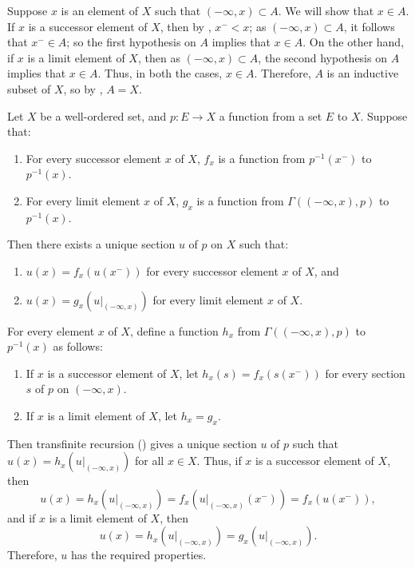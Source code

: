 \documentclass{article}
\begin{document}
Suppose \(x\) is an element of \(X\) such that
\((-\infty, x) \subset A\).  We will show that \(x \in A\).  If \(x\)
is a successor element of \(X\), then by ,
\(x^- < x\); as \((-\infty, x) \subset A\), it follows that
\(x^- \in A\); so the first hypothesis on \(A\) implies that
\(x \in A\).  On the other hand, if \(x\) is a limit element of \(X\),
then as \((-\infty, x) \subset A\), the second hypothesis on \(A\)
implies that \(x \in A\).  Thus, in both the cases, \(x \in A\).
Therefore, \(A\) is an inductive subset of \(X\), so by
, \(A = X\).

\begin{theorem}
  \label{thm:83vd5knr}
  Let \(X\) be a well-ordered set, and \(p : E \to X\) a function from
  a set \(E\) to \(X\).  Suppose that:
  \begin{enumerate}
  \item For every successor element \(x\) of \(X\), \(f_x\) is a
    function from \(p^{-1}(x^-)\) to \(p^{-1}(x)\).
  \item For every limit element \(x\) of \(X\), \(g_x\) is a function
    from \(\Gamma((-\infty, x), p)\) to \(p^{-1}(x)\).
  \end{enumerate}
  Then there exists a unique section \(u\) of \(p\) on \(X\) such
  that:
  \begin{enumerate}
  \item \(u(x) = f_x(u(x^-))\) for every successor element \(x\) of
    \(X\), and
  \item \(u(x) = g_x(u \vert_{(-\infty, x)})\) for every limit element
    \(x\) of \(X\).
  \end{enumerate}
\end{theorem}

For every element \(x\) of \(X\), define a function \(h_x\) from
\(\Gamma((-\infty, x), p)\) to \(p^{-1}(x)\) as follows:
\begin{enumerate}
\item If \(x\) is a successor element of \(X\), let
  \(h_x(s) = f_x(s(x^-))\) for every section \(s\) of \(p\) on
  \((-\infty, x)\).
\item If \(x\) is a limit element of \(X\), let \(h_x = g_x\).
\end{enumerate}
Then transfinite recursion () gives a unique
section \(u\) of \(p\) such that
\(u(x) = h_x(u \vert_{(-\infty, x)})\) for all \(x \in X\).  Thus, if
\(x\) is a successor element of \(X\), then
\begin{displaymath}
  u(x) =
  h_x(u \vert_{(-\infty, x)}) =
  f_x(u \vert_{(-\infty, x)} (x^-)) =
  f_x(u(x^-)),
\end{displaymath}
and if \(x\) is a limit element of \(X\), then
\begin{displaymath}
  u(x) = h_x(u \vert_{(-\infty, x)}) = g_x(u \vert_{(-\infty, x)}).
\end{displaymath}
Therefore, \(u\) has the required properties.
\end{document}
